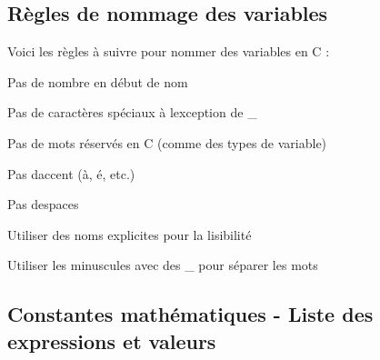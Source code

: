 \subsection*{Règles de nommage des variables}

Voici les règles à suivre pour nommer des variables en C \+:


\begin{DoxyItemize}
\item Pas de nombre en début de nom
\item Pas de caractères spéciaux à l\textquotesingle{}exception de {\ttfamily \+\_\+}
\item Pas de mots réservés en C (comme des types de variable)
\item Pas d\textquotesingle{}accent ({\ttfamily à}, {\ttfamily é}, etc.)
\item Pas d\textquotesingle{}espaces
\item Utiliser des noms explicites pour la lisibilité
\item Utiliser les minuscules avec des {\ttfamily \+\_\+} pour séparer les mots
\end{DoxyItemize}

\subsection*{Constantes mathématiques -\/ Liste des expressions et valeurs}


